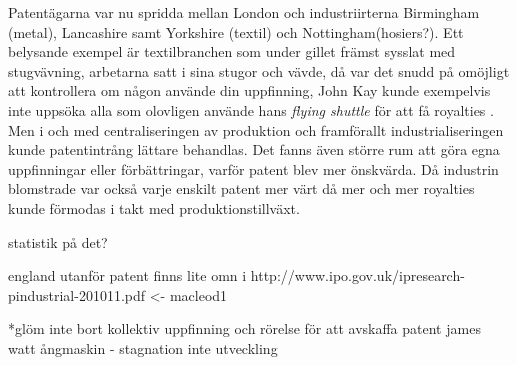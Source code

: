 Patentägarna var nu spridda mellan London och industriirterna Birmingham (metal), Lancashire samt
Yorkshire (textil) och Nottingham(hosiers?). Ett belysande exempel är textilbranchen som under gillet
främst sysslat med stugvävning, arbetarna satt i sina stugor och vävde, då var det snudd på omöjligt att
kontrollera om någon använde din uppfinning, John Kay kunde exempelvis inte uppsöka alla som olovligen
använde hans \emph{flying shuttle} för att få royalties \cite{macleod}. Men i och med centraliseringen av produktion och
framförallt industrialiseringen kunde patentintrång lättare behandlas. Det fanns även större rum att göra
egna uppfinningar eller förbättringar, varför patent blev mer önskvärda. Då industrin blomstrade var
också varje enskilt patent mer värt då mer och mer royalties kunde förmodas i takt med
produktionstillväxt.

statistik på det?

england utanför patent finns lite omn i http://www.ipo.gov.uk/ipresearch-pindustrial-201011.pdf <- macleod1


*glöm inte bort kollektiv uppfinning och rörelse för att avskaffa patent james watt ångmaskin -
stagnation inte utveckling


